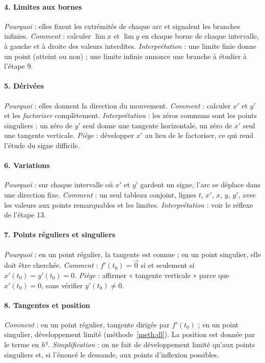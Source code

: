 \documentclass[a4paper,11pt]{article}
\numberwithin{equation}{section}
\numberwithin{figure}{section}
\numberwithin{table}{section}
\theoremstyle{enonce}
\theoremstyle{exemple}
\theoremstyle{remarque}
\newcommand{\ve}[1]{\vec{#1}}
\begin{document}
\paragraph{4. Limites aux bornes}
\emph{Pourquoi} : elles fixent les extrémités de chaque arc et signalent les branches infinies. \emph{Comment} : calculer
$\lim x$ et $\lim y$ en chaque borne de chaque intervalle, à gauche et à droite des valeurs interdites. \emph{Interprétation}
: une limite finie donne un point (atteint ou non) ; une limite infinie annonce une branche à étudier à l'étape 9.

\paragraph{5. Dérivées}
\emph{Pourquoi} : elles donnent la direction du mouvement. \emph{Comment} : calculer $x'$ et $y'$ et les \emph{factoriser}
complètement. \emph{Interprétation} : les zéros communs sont les points singuliers ; un zéro de $y'$ seul donne une
tangente horizontale, un zéro de $x'$ seul une tangente verticale. \emph{Piège} : développer $x'$ au lieu de le factoriser,
ce qui rend l'étude du signe difficile.

\paragraph{6. Variations}
\emph{Pourquoi} : sur chaque intervalle où $x'$ et $y'$ gardent un signe, l'arc se déplace dans une direction fixe.
\emph{Comment} : un seul tableau conjoint, lignes $t$, $x'$, $x$, $y$, $y'$, avec les valeurs aux points remarquables et les
limites. \emph{Interprétation} : voir le réflexe de l'étape 13.

\paragraph{7. Points réguliers et singuliers}
\emph{Pourquoi} : en un point régulier, la tangente est connue ; en un point singulier, elle doit être cherchée.
\emph{Comment} : $f'(t_0)=\ve0$ si et seulement si $x'(t_0)=y'(t_0)=0$. \emph{Piège} : affirmer « tangente verticale » parce
que $x'(t_0)=0$, sans vérifier $y'(t_0)\neq0$.

\paragraph{8. Tangentes et position}
\emph{Comment} : en un point régulier, tangente dirigée par $f'(t_0)$ ; en un point singulier, développement limité
(méthode~\ref{meth:dl}). La position est donnée par le terme en $h^q$. \emph{Simplification} : on ne fait de développement
limité qu'aux points singuliers et, si l'énoncé le demande, aux points d'inflexion possibles.
\end{document}
